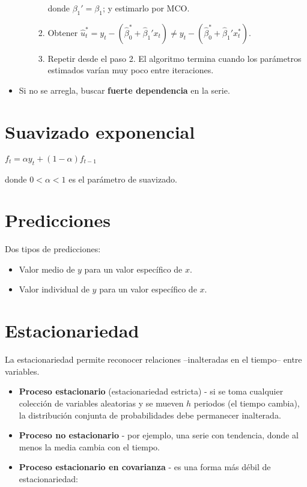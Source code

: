 \documentclass[10pt, a4paper, landscape]{article}
\begin{document}
\begin{multicols}{3}
\begin{itemize}[leftmargin=*]
\begin{itemize}[leftmargin=*]
\begin{enumerate}[leftmargin=*]
					donde $\beta_{1}' = \beta_{1}$; y estimarlo por MCO.
					
					\item Obtener $\hat{u}_{t}^{*} = y_{t} - (\hat{\beta}_{0}^{*} + \hat{\beta}_{1}' x_{t}) \neq y_{t} - (\hat{\beta}_{0}^{*} + \hat{\beta}_{1}' x_{t}^{*})$.
					\item Repetir desde el paso 2. El algoritmo termina cuando los parámetros estimados varían muy poco entre iteraciones.
				\end{enumerate}
			\end{itemize}
			
			\item Si no se arregla, buscar \textbf{fuerte dependencia} en la serie.
		\end{itemize}
		
		\section*{Suavizado exponencial}
		
		\begin{center}
			$f_{t} = \alpha y_{t} + (1 - \alpha) f_{t - 1}$
		\end{center}
		
		donde $0 < \alpha < 1$ es el parámetro de suavizado.
		
		\section*{Predicciones}
		
		Dos tipos de predicciones:
		
		\begin{itemize}[leftmargin=*]
			\item Valor medio de $y$ para un valor específico de $x$.
			\item Valor individual de $y$ para un valor específico de $x$.
		\end{itemize}
		
		\columnbreak
		
		\section*{Estacionariedad}
		
		La estacionariedad permite reconocer relaciones --inalteradas en el tiempo-- entre variables.
		
		\begin{itemize}[leftmargin=*]
			\item \textbf{Proceso estacionario} (estacionariedad estricta) - si se toma cualquier colección de variables aleatorias y se mueven $h$ periodos (el tiempo cambia), la distribución conjunta de probabilidades debe permanecer inalterada.
			\item \textbf{Proceso no estacionario} - por ejemplo, una serie con tendencia, donde al menos la media cambia con el tiempo.
			\item \textbf{Proceso estacionario en covarianza} - es una forma más débil de estacionariedad:
			

\end{itemize}
\end{multicols}
\end{document}
